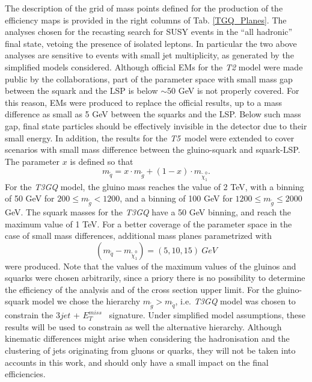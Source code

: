 \documentclass[a4paper,11pt]{article}
\newcommand{\MET}{{ $E_T ^{miss}$}}
\newcommand{\Tfive}{ \textit{T5}}
\begin{document}
The description of the grid of mass points defined for the production of the efficiency maps is provided in the right columns of Tab. \ref{TGQ_Planes}. The analyses chosen for the recasting search for SUSY events in the ``all hadronic'' final state, vetoing the presence of isolated leptons. In particular the two above analyses are sensitive to events with small jet multiplicity, as generated by the simplified models considered. Although official EMs for the \textit{T2} model were made public by the collaborations, part of the parameter space with small mass gap between the squark and the LSP is below $\sim$50 GeV is not properly covered. For this reason, EMs were produced to replace the official results, up to a mass difference as small as 5 GeV between the squarks and the LSP. Below such mass gap, final state particles should be effectively invisible in the detector due to their small energy. In addition, the results for the \Tfive~model were extended to cover scenarios with small mass difference between the gluino-squark and squark-LSP. The parameter $x$ is defined so that
\begin{equation}
m_{\tilde q}= x\cdot m_{\tilde g} + (1-x)\cdot m_{\tilde \chi_1 ^0}.
\end{equation}
%
For the \textit{T3GQ} model, the gluino mass reaches the value of 2 TeV, with a binning of 50 GeV for $200 \leq m_{\tilde g} < 1200$, and a binning of 100 GeV for $1200 \leq m_{\tilde g}  \leq 2000$ GeV. The squark masses for the \textit{T3GQ} have a 50 GeV binning, and reach the maximum value of 1 TeV. For a better coverage of the parameter space in the case of small mass differences, additional mass planes parametrized with 
\begin{equation}
( m_{\tilde q} - m_{\tilde \chi _1 ^0})=(5,10,15) \ GeV
\end{equation}
were produced. Note that the values of the maximum values of the gluinos and squarks were chosen arbitrarily, since a priory there is no possibility to determine the efficiency of the analysis and of the cross section upper limit.
%
%
For the gluino-squark model we chose the hierarchy $m_{\tilde g} > m_{\tilde q}$, i.e. \textit{T3GQ} model was chosen to constrain the  $3jet$ + \MET~ signature. Under simplified model assumptions, these results will be used to constrain as well the alternative hierarchy. Although kinematic differences might arise when considering the hadronisation and the clustering of jets originating from gluons or quarks, they will not be taken into accounts in this work, and should only have a small impact on the final efficiencies.  
\end{document}
